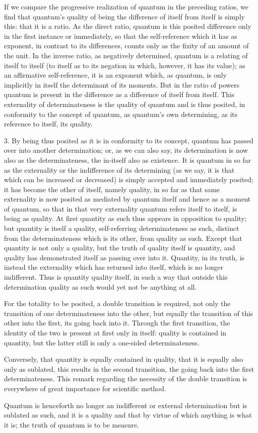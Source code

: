If we compare the progressive realization
of quantum in the preceding ratios,
we find that quantum's quality of being
the difference of itself from itself is simply this:
that it is a ratio.
As the direct ratio, quantum is this posited difference
only in the first instance or immediately,
so that the self-reference which it has as exponent,
in contrast to its differences,
counts only as the fixity of an amount of the unit.
In the inverse ratio, as negatively determined,
quantum is a relating of itself to itself
(to itself as to its negation
in which, however, it has its value);
as an affirmative self-reference,
it is an exponent which, as quantum,
is only implicitly in itself the determinant of its moments.
But in the ratio of powers quantum is present
in the difference as a difference of itself from itself.
This externality of determinateness is
the quality of quantum and is thus posited,
in conformity to the concept of quantum,
as quantum's own determining,
as its reference to itself, its quality.

3. By being thus posited as it is in conformity to its concept,
quantum has passed over into another determination;
or, as we can also say, its determination is
now also as the determinateness,
the in-itself also as existence.
It is quantum in so far as the externality
or the indifference of its determining
(as we say, it is that which can be increased or decreased)
is simply accepted and immediately posited;
it has become the other of itself, namely quality,
in so far as that same externality is now posited
as mediated by quantum itself
and hence as a moment of quantum,
so that in that very externality
quantum refers itself to itself,
is being as quality.
At first quantity as such thus appears
in opposition to quality;
but quantity is itself a quality,
self-referring determinateness as such,
distinct from the determinateness which is its other,
from quality as such.
Except that quantity is not only a quality,
but the truth of quality itself is quantity,
and quality has demonstrated itself as passing over into it.
Quantity, in its truth, is instead the externality
which has returned into itself,
which is no longer indifferent.
Thus is quantity quality itself,
in such a way that outside this determination
quality as such would yet not be anything at all.

For the totality to be posited, a double transition is required,
not only the transition of one determinateness into the other,
but equally the transition of this other into the first,
its going back into it.
Through the first transition,
the identity of the two is present at first only in itself:
quality is contained in quantity,
but the latter still is only a one-sided determinateness.

Conversely, that quantity is equally contained in quality,
that it is equally also only as sublated,
this results in the second transition,
the going back into the first determinateness.
This remark regarding the necessity of the double transition
is everywhere of great importance for scientific method.

Quantum is henceforth no longer an indifferent
or external determination but is sublated as such,
and it is a quality and that by virtue of which
anything is what it is;
the truth of quantum is to be measure.
